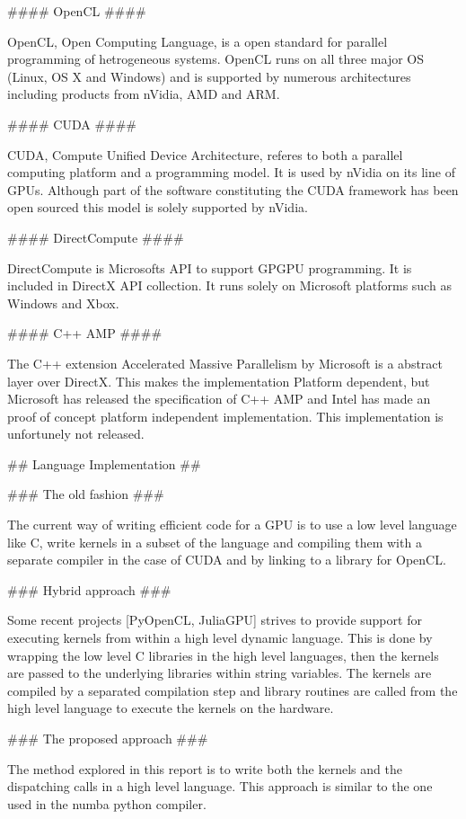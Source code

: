 \begin{markdown}
#### OpenCL ####

OpenCL, Open Computing Language, is a open standard for parallel
programming of hetrogeneous systems. OpenCL runs on all three major OS
(Linux, OS X and Windows) and is supported by numerous architectures
including products from nVidia, AMD and ARM.

#### CUDA ####

CUDA, Compute Unified Device Architecture, referes to both a parallel
computing platform and a programming model. It is used by nVidia on
its line of GPUs. Although part of the software constituting the CUDA
framework has been open sourced this model is solely supported by
nVidia.

#### DirectCompute ####

DirectCompute is Microsofts API to support GPGPU programming. It is
included in DirectX API collection. It runs solely on Microsoft
platforms such as Windows and Xbox.

#### C++ AMP ####

The C++ extension Accelerated Massive Parallelism by Microsoft is a
abstract layer over DirectX. This makes the implementation Platform
dependent, but Microsoft has released the specification of C++ AMP and
Intel has made an proof of concept platform independent
implementation. This implementation is unfortunely not released.

## Language Implementation ##

### The old fashion ###

The current way of writing efficient code for a GPU is to use a low
level language like C, write kernels in a subset of the language and
compiling them with a separate compiler in the case of CUDA and by
linking to a library for OpenCL.

### Hybrid approach ###

Some recent projects [PyOpenCL, JuliaGPU] strives to provide support
for executing kernels from within a high level dynamic language. This
is done by wrapping the low level C libraries in the high level
languages, then the kernels are passed to the underlying libraries
within string variables. The kernels are compiled by a separated
compilation step and library routines are called from the high level
language to execute the kernels on the hardware.

### The proposed approach ###

The method explored in this report is to write both the kernels and the
dispatching calls in a high level language. This approach is similar
to the one used in the numba python compiler.


\end{markdown}
